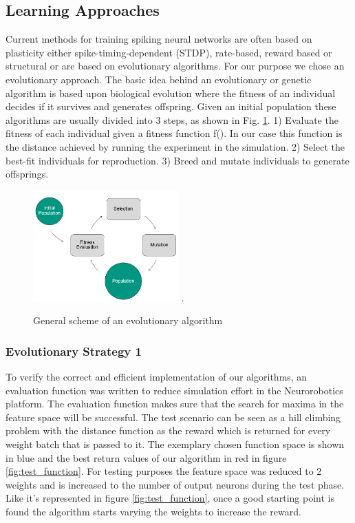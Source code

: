 \subsection{Learning Approaches}
Current methods for training spiking neural networks are often based on plasticity either spike-timing-dependent (STDP), rate-based, reward based or structural or are based on evolutionary algorithms. %
 For our purpose we chose an evolutionary approach. The basic idea behind an evolutionary or genetic algorithm is based upon biological evolution where the fitness of an individual decides if it survives and generates offspring. Given an initial population these algorithms are usually divided into 3 steps, as shown in Fig. \ref{evo_base}. 1) Evaluate the fitness of each individual given a fitness function f(). In our case this function is the distance achieved by running the experiment in the simulation. 2) Select the best-fit individuals for reproduction. 3) Breed and mutate individuals to generate offsprings.

\begin{figure}[H]
	\centering
	\includegraphics[width=2.2in]{img/evo_base.png}
	\DeclareGraphicsExtensions.
	\caption{General scheme of an evolutionary algorithm}
	\label{evo_base}
\end{figure}

\subsubsection{Evolutionary Strategy 1}


To verify the correct and efficient implementation of our algorithms, an evaluation function was written to reduce simulation effort in the Neurorobotics platform. The evaluation function makes sure that the search for maxima in the feature space will be successful. The test scenario can be seen as a hill climbing problem with the distance function as the reward which is returned for every weight batch that is passed to it. The exemplary chosen function space is shown in blue and the best return values of our algorithm in red in figure \ref{fig:test_function}. For testing purposes the feature space was reduced to 2 weights and is increased to the number of output neurons during the test phase.
Like it's represented in figure \ref{fig:test_function}, once a good starting point is found the algorithm starts varying the weights to increase the reward. 


